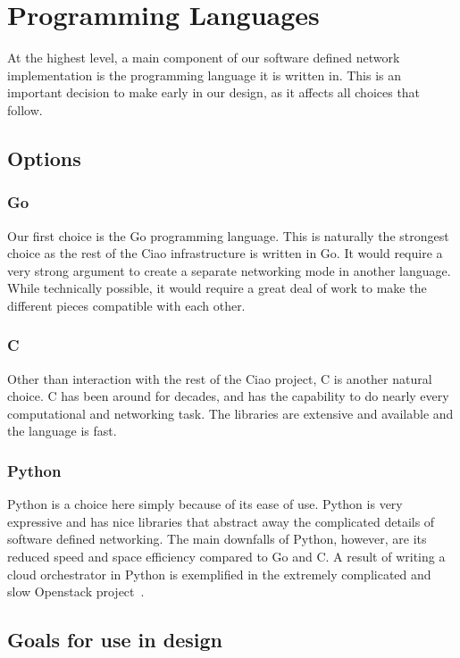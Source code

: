 \documentclass[10pt,letterpaper,onecolumn,draftclsnofoot]{IEEEtran}
\begin{document}
\section{Programming Languages}

At the highest level, a main component of our software defined network
implementation is the programming language it is written in. This is an
important decision to make early in our design, as it affects all choices that
follow.

\subsection{Options}

\subsubsection{Go}

Our first choice is the Go programming language. This is naturally the strongest
choice as the rest of the Ciao infrastructure is written in Go. It would require
a very strong argument to create a separate networking mode in another language.
While technically possible, it would require a great deal of work to make the
different pieces compatible with each other.

\subsubsection{C}

Other than interaction with the rest of the Ciao project, C is another natural
choice. C has been around for decades, and has the capability to do nearly every
computational and networking task. The libraries are extensive and available and
the language is fast.

\subsubsection{Python}

Python is a choice here simply because of its ease of use. Python is very
expressive and has nice libraries that abstract away the complicated details of
software defined networking. The main downfalls of Python, however, are its
reduced speed and space efficiency compared to Go and C. A result of writing a
cloud orchestrator in Python is exemplified in the extremely complicated and
slow Openstack project~\cite{uglyopenstack}.

\subsection{Goals for use in design}
\end{document}

